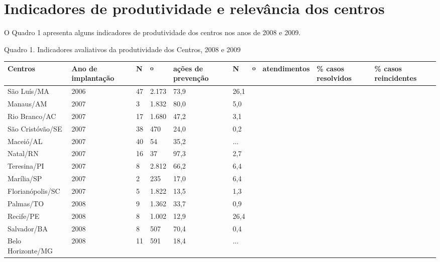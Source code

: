 \documentclass{article}
\begin{document}
\section{Indicadores de produtividade e relevância dos centros}

O Quadro 1 apresenta alguns indicadores de produtividade dos centros nos anos de
2008 e 2009.

Quadro 1. Indicadores avaliativos da produtividade dos Centros, 2008 e 2009
\begin{table}
\begin{xtabular}{ l | l | l | l | l | l | l | l | l | l }
\hline
Centros & Ano de implantação & N &\textsuperscript{o}
& ações de prevenção & N &\textsuperscript{o}
& atendimentos & \% casos resolvidos & \% casos reincidentes\\ \hline
São Luís/MA
& 2006
& 47
& 2.173
& 73,9
& 26,1
\\ \hline

Manaus/AM
& 2007
& 3
& 1.832
& 80,0
& 5,0
\\ \hline

Rio Branco/AC
& 2007
& 17
& 1.680
& 47,2
& 3,1
\\ \hline

São Cristóvão/SE
& 2007
& 38
& 470
& 24,0
& 0,2
\\ \hline

Maceió/AL
& 2007
& 40
& 54
& 35,2
& ...
\\ \hline

Natal/RN
& 2007
& 16
& 37
& 97,3
& 2,7
\\ \hline

Teresina/PI
& 2007
& 8
& 2.812
& 66,2
& 6,4
\\ \hline

Marília/SP
& 2007
& 2
& 235
& 17,0
& 6,4
\\ \hline

Florianópolis/SC
& 2007
& 5
& 1.822
& 13,5
& 1,3
\\ \hline

Palmas/TO
& 2008
& 9
& 1.362
& 33,7
& 0,9
\\ \hline

Recife/PE
& 2008
& 8
& 1.002
& 12,9
& 26,4
\\ \hline

Salvador/BA
& 2008
& 8
& 507
& 70,4
& 0,4
\\ \hline

Belo Horizonte/MG
& 2008
& 11
& 591
& 18,4
& ...
\\ \hline


\end{xtabular}
\end{table}
\end{document}

